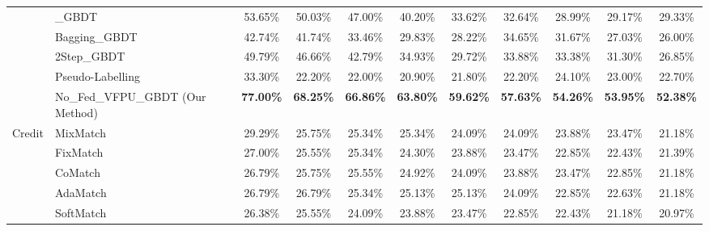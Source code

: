 \begin{table}
\begin{tabular}{llccccccccc}
							 & \_GBDT                           & 53.65\%          & 50.03\%          & 47.00\%          & 40.20\%          & 33.62\%          & 32.64\%          & 28.99\%          & 29.17\%          & 29.33\%           \\
							 & Bagging\_GBDT                    & 42.74\%          & 41.74\%          & 33.46\%          & 29.83\%          & 28.22\%          & 34.65\%          & 31.67\%          & 27.03\%          & 26.00\%           \\
							 & 2Step\_GBDT                      & 49.79\%          & 46.66\%          & 42.79\%          & 34.93\%          & 29.72\%          & 33.88\%          & 33.38\%          & 31.30\%          & 26.85\%           \\
							 & Pseudo-Labelling                 & 33.30\%          & 22.20\%          & 22.00\%          & 20.90\%          & 21.80\%          & 22.20\%          & 24.10\%          & 23.00\%          & 22.70\%           \\
							 & No\_Fed\_VFPU\_GBDT (Our Method) & \textbf{77.00\%} & \textbf{68.25\%} & \textbf{66.86\%} & \textbf{63.80\%} & \textbf{59.62\%} & \textbf{57.63\%} & \textbf{54.26\%} & \textbf{53.95\%} & \textbf{52.38\%}  \\ 
	\hline
	\multirow{10}{*}{Credit} & MixMatch                         & 29.29\%          & 25.75\%          & 25.34\%          & 25.34\%          & 24.09\%          & 24.09\%          & 23.88\%          & 23.47\%          & 21.18\%           \\
							 & FixMatch                         & 27.00\%          & 25.55\%          & 25.34\%          & 24.30\%          & 23.88\%          & 23.47\%          & 22.85\%          & 22.43\%          & 21.39\%           \\
							 & CoMatch                          & 26.79\%          & 25.75\%          & 25.55\%          & 24.92\%          & 24.09\%          & 23.88\%          & 23.47\%          & 22.85\%          & 21.18\%           \\
							 & AdaMatch                         & 26.79\%          & 26.79\%          & 25.34\%          & 25.13\%          & 25.13\%          & 24.09\%          & 22.85\%          & 22.63\%          & 21.18\%           \\
							 & SoftMatch                        & 26.38\%          & 25.55\%          & 24.09\%          & 23.88\%          & 23.47\%          & 22.85\%          & 22.43\%          & 21.18\%          & 20.97\%           \\

\end{tabular}
\end{table}
